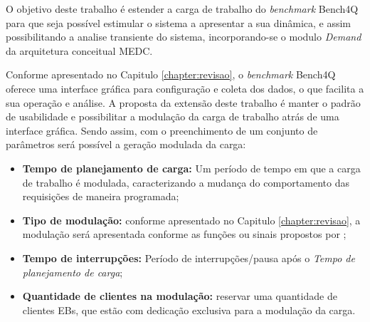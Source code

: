 
O objetivo deste trabalho é estender a carga de trabalho do \textit{benchmark} Bench4Q para que seja possível estimular o sistema a apresentar a sua dinâmica, e assim possibilitando a analise transiente do sistema, incorporando-se o modulo \textit{Demand} da arquitetura conceitual MEDC. 

Conforme apresentado no Capitulo \ref{chapter:revisao}, o \textit{benchmark} Bench4Q oferece uma interface gráfica para configuração e coleta dos dados, o que facilita a sua operação e análise. A proposta da extensão deste trabalho é manter o padrão de usabilidade e possibilitar a modulação da carga de trabalho atrás de uma interface gráfica. Sendo assim, com o preenchimento de um conjunto de parâmetros será possível a geração modulada da carga:
\begin{itemize}
	\item \textbf{Tempo de planejamento de carga:} Um período de tempo em que a carga de trabalho é modulada, caracterizando a mudança do comportamento das requisições de maneira programada;
	
	\item \textbf{Tipo de modulação:} conforme apresentado no Capitulo \ref{chapter:revisao}, a modulação será apresentada conforme as funções ou sinais propostos por ;
	
	\item \textbf{Tempo de interrupções:} Período de interrupções/pausa após o \textit{Tempo de planejamento de carga};
	
	\item \textbf{Quantidade de clientes na modulação:} reservar uma quantidade de clientes EBs, que estão com dedicação exclusiva para a modulação da carga.
\end{itemize}

